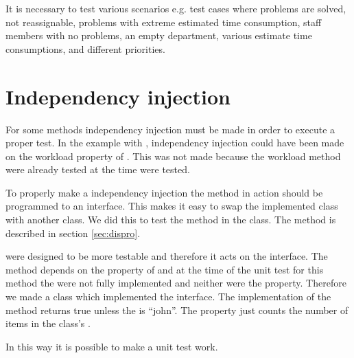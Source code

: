 It is necessary to test various scenarios e.g. test cases where problems are solved, not reassignable, problems with extreme estimated time consumption, staff members with no problems, an empty department, various estimate time consumptions, and different priorities. 


\section{Independency injection}
\label{sec:independencyInjection}
For some methods independency injection must be made in order to execute a proper test. 
In the example with , independency injection could have been made on the workload property of . 
This was not made because the workload method were already tested at the time  were tested.

To properly make a independency injection the method in action should be programmed to an interface. 
This makes it easy to swap the implemented class with another class. 
We did this to test the method  in the  class. 
The method is described in section \ref{sec:dispro}.

 were designed to be more testable and therefore it acts on the  interface. 
The method depends on the  property of  and at the time of the unit test for this method the  were not fully implemented and neither were the  property. 
Therefore we made a  class which implemented the  interface.
The  implementation of the  method returns true unless the  is ``john''. 
The  property just counts the number of items in the  class's . 

In this way it is possible to make a unit test work. 

